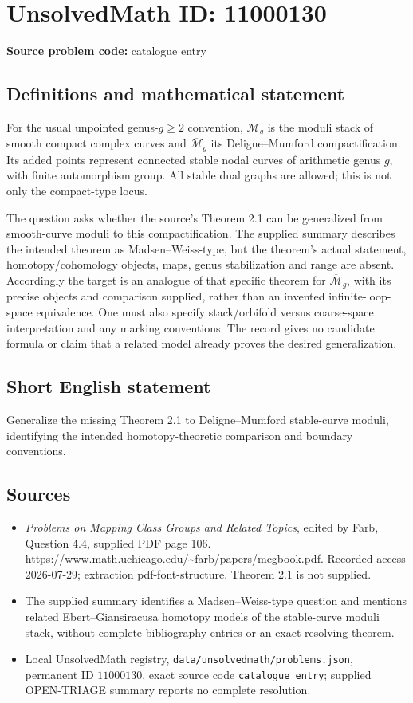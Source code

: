 \documentclass[11pt]{article}
\begin{document}
\section*{UnsolvedMath ID: 11000130}
\textbf{Source problem code:} catalogue entry
\subsection{Definitions and mathematical statement}
For the usual unpointed genus-\(g\geq2\) convention, \(\mathcal M_g\) is the moduli stack of smooth compact complex curves and \(\overline{\mathcal M}_g\) its Deligne--Mumford compactification. Its added points represent connected stable nodal curves of arithmetic genus \(g\), with finite automorphism group. All stable dual graphs are allowed; this is not only the compact-type locus.

The question asks whether the source's Theorem 2.1 can be generalized from smooth-curve moduli to this compactification. The supplied summary describes the intended theorem as Madsen--Weiss-type, but the theorem's actual statement, homotopy/cohomology objects, maps, genus stabilization and range are absent. Accordingly the target is an analogue of that specific theorem for \(\overline{\mathcal M}_g\), with its precise objects and comparison supplied, rather than an invented infinite-loop-space equivalence. One must also specify stack/orbifold versus coarse-space interpretation and any marking conventions. The record gives no candidate formula or claim that a related model already proves the desired generalization.
\subsection{Short English statement}
Generalize the missing Theorem 2.1 to Deligne--Mumford stable-curve moduli, identifying the intended homotopy-theoretic comparison and boundary conventions.
\subsection{Sources}
\begin{itemize}
\item \emph{Problems on Mapping Class Groups and Related Topics}, edited by Farb, Question 4.4, supplied PDF page 106. \url{https://www.math.uchicago.edu/~farb/papers/mcgbook.pdf}. Recorded access 2026-07-29; extraction pdf-font-structure. Theorem 2.1 is not supplied.
\item The supplied summary identifies a Madsen--Weiss-type question and mentions related Ebert--Giansiracusa homotopy models of the stable-curve moduli stack, without complete bibliography entries or an exact resolving theorem.
\item Local UnsolvedMath registry, \texttt{data/unsolvedmath/problems.json}, permanent ID \(11000130\), exact source code \texttt{catalogue entry}; supplied OPEN-TRIAGE summary reports no complete resolution.
\end{itemize}
\end{document}
